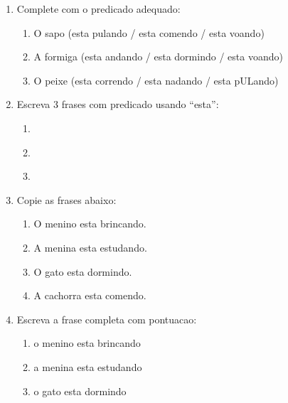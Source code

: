 \begin{exercicio}
\begin{enumerate}[resume]
  \item Complete com o predicado adequado:
  \begin{enumerate}[label=\alph*)]
    \item O sapo \underline{\hspace{3cm}} (esta pulando / esta comendo / esta voando)
    \item A formiga \underline{\hspace{3cm}} (esta andando / esta dormindo / esta voando)
    \item O peixe \underline{\hspace{3cm}} (esta correndo / esta nadando / esta pULando)
  \end{enumerate}

  \item Escreva 3 frases com predicado usando ``esta'':
  \begin{enumerate}[label=\alph*)]
    \item \underline{\hspace{8cm}}
    \item \underline{\hspace{8cm}}
    \item \underline{\hspace{8cm}}
  \end{enumerate}

  \item Copie as frases abaixo:
  \begin{enumerate}[label=\alph*)]
    \item O menino esta brincando.
    \item A menina esta estudando.
    \item O gato esta dormindo.
    \item A cachorra esta comendo.
  \end{enumerate}

  \item Escreva a frase completa com pontuacao:
  \begin{enumerate}[label=\alph*)]
    \item o menino esta brincando \underline{\hspace{1cm}}
    \item a menina esta estudando \underline{\hspace{1cm}}
    \item o gato esta dormindo \underline{\hspace{1cm}}
  \end{enumerate}
\end{enumerate}


\end{exercicio}
